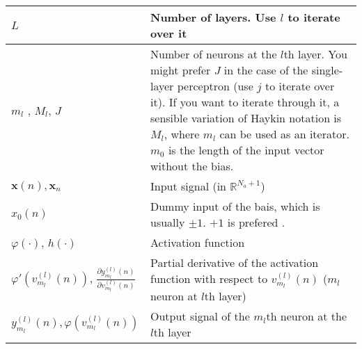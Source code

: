 \documentclass{article}
\begin{document}
\begin{xltabular}{\textwidth}{XX}
    \(L\) & Number of layers. Use \(l\) to iterate over it \\ \hline
    \(m_l\) \cite{bishopPatternRecognitionMachine2006}, \(M_l\), \(J\) \cite{bishopPatternRecognitionMachine2006} & Number of neurons at the \(l\)th layer. You might prefer \(J\) in the case of the single-layer perceptron (use \(j\) to iterate over it). If you want to iterate through it, a sensible variation of Haykin notation is \(M_l\), where \(m_l\) can be used as an iterator. \(m_0\) is the length of the input vector without the bias. \\ \hline
	\(\mathbf{x}(n), \mathbf{x}_n\)                                                                                       & Input signal (in \(\mathbb{R}^{N_a + 1}\))  \\ \hline
	\(x_0(n)\)                                                                                                      & Dummy input of the bais, which is usually \(\pm 1\). \(+1\) is prefered \cite{bishopPatternRecognitionMachine2006,haykinNeuralNetworksLearning2009}.                                                                                                                                                                                    \\ \hline
    \(\varphi(\cdot)\)\cite{haykinNeuralNetworksLearning2009}, \(h(\cdot)\)\cite{bishopPatternRecognitionMachine2006}                                                                                                    & Activation function                                                                                                                                                                                                          \\ \hline
    \(\varphi'(v_{m_l}^{(l)}(n))\)\cite{haykinNeuralNetworksLearning2009}, \(\frac{\partial y_{m_l}^{(l)}(n)}{\partial v_{m_l}^{(l)}(n)}\) \cite{haykinNeuralNetworksLearning2009}                                                                                                    & Partial derivative of the activation function with respect to \(v_{m_l}^{(l)}(n)\) (\(m_l\) neuron at \(l\)th layer)                                                                                                                                                                                                          \\ \hline
	\(y_{m_l}^{(l)}(n), \varphi \left( v_{m_l}^{(l)}(n) \right)\)                                                                                    & Output signal of the \(m_l\)th neuron at the \(l\)th layer                                                                                                                                                          \\ \hline

\end{xltabular}
\end{document}
